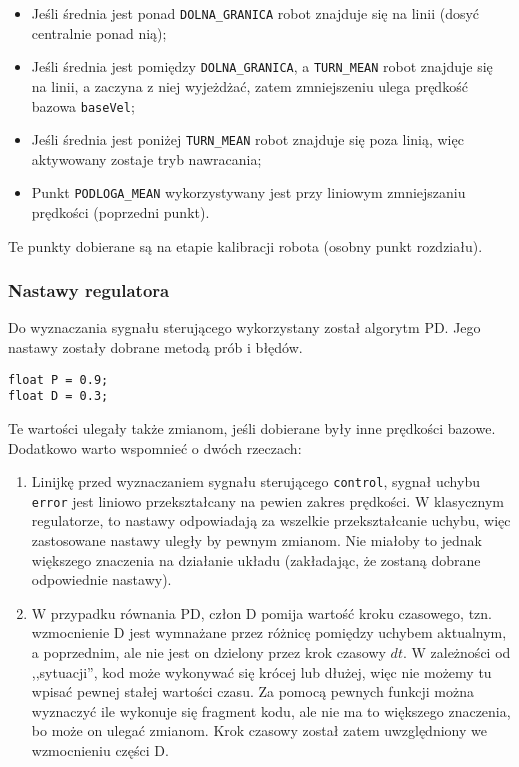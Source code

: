 \documentclass[11pt]{article}
\begin{document}
\begin{itemize}
\item Jeśli średnia jest ponad \texttt{DOLNA\_GRANICA} robot znajduje się na linii (dosyć centralnie ponad nią);
\item Jeśli średnia jest pomiędzy \texttt{DOLNA\_GRANICA}, a \texttt{TURN\_MEAN} robot znajduje się na linii, a zaczyna z niej wyjeżdżać, zatem zmniejszeniu ulega prędkość bazowa \texttt{baseVel};
\item Jeśli średnia jest poniżej \texttt{TURN\_MEAN} robot znajduje się poza linią, więc aktywowany zostaje tryb nawracania;
\item Punkt \texttt{PODLOGA\_MEAN} wykorzystywany jest przy liniowym zmniejszaniu prędkości (poprzedni punkt).
\end{itemize}

Te punkty dobierane są na etapie kalibracji robota (osobny punkt rozdziału).

\subsubsection{Nastawy regulatora}

Do wyznaczania sygnału sterującego wykorzystany został algorytm PD. Jego nastawy zostały dobrane metodą prób i błędów.
\begin{lstlisting}[firstnumber = 73]
float P = 0.9;
float D = 0.3;
\end{lstlisting}

Te wartości ulegały także zmianom, jeśli dobierane były inne prędkości bazowe. Dodatkowo warto wspomnieć o dwóch rzeczach:
\begin{enumerate}
\item Linijkę przed wyznaczaniem sygnału sterującego \texttt{control}, sygnał uchybu \texttt{error} jest liniowo przekształcany na pewien zakres prędkości. W klasycznym regulatorze, to nastawy odpowiadają za wszelkie przekształcanie uchybu, więc zastosowane nastawy uległy by pewnym zmianom. Nie miałoby to jednak większego znaczenia na działanie układu (zakładając, że zostaną dobrane odpowiednie nastawy).
\item W przypadku równania PD, człon D pomija wartość kroku czasowego, tzn. wzmocnienie D jest wymnażane przez różnicę pomiędzy uchybem aktualnym, a poprzednim, ale nie jest on dzielony przez krok czasowy $dt$. W zależności od ,,sytuacji'', kod może wykonywać się krócej lub dłużej, więc nie możemy tu wpisać pewnej stałej wartości czasu. Za pomocą pewnych funkcji można wyznaczyć ile wykonuje się fragment kodu, ale nie ma to większego znaczenia, bo może on ulegać zmianom. Krok czasowy został zatem uwzględniony we wzmocnieniu części D.
\end{enumerate}
\end{document}
